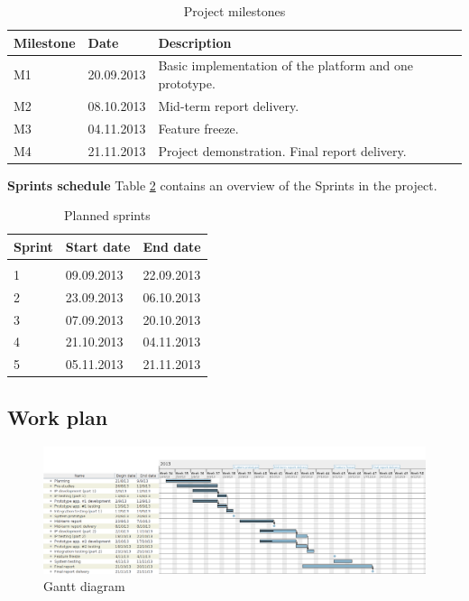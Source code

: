 \begin{table}[h]
\begin{center}
\begin{tabular}{ | l | l | l | }
  \hline
  Milestone & Date & Description \\
  \hline\noalign{\smallskip}\noalign{\smallskip}\hline
  M1 & 20.09.2013 & Basic implementation of the platform and one prototype. \\ 
  M2 & 08.10.2013 & Mid-term report delivery. \\
  M3 & 04.11.2013 & Feature freeze. \\
  M4 & 21.11.2013 & Project demonstration. Final report delivery. \\
  \hline
\end{tabular}
\end{center}
\caption{Project milestones}
\label{table:milestones}
\end{table}

\textbf{Sprints schedule} \newline
Table \ref{table:sprints} contains an overview of the Sprints in the project.

\begin{table}[h]
\begin{center}
\begin{tabular}{ | l | l | l | }
  \hline
  Sprint & Start date & End date \\
  \hline\noalign{\smallskip}\noalign{\smallskip}\hline
  0 &  &  \\ 
  1 & 09.09.2013 & 22.09.2013 \\
  2 & 23.09.2013 & 06.10.2013 \\
  3 & 07.09.2013 & 20.10.2013 \\
  4 & 21.10.2013 & 04.11.2013 \\
  5 & 05.11.2013 & 21.11.2013 \\
  \hline
\end{tabular}
\end{center}
\caption{Planned sprints}
\label{table:sprints}
\end{table}

\subsection{Work plan}
\newpage
\begin{landscape}
\begin{figure}[h]
\includegraphics[scale=0.66]{../Figures/gantt-diagram.png}
\caption{Gantt diagram}
\label{figure:work-splan}
\end{figure}
\end{landscape}

